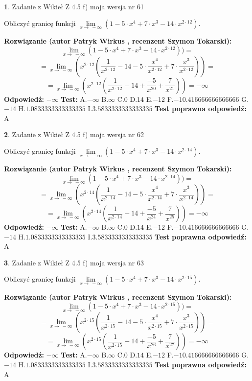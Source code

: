 \documentclass[12pt, a4paper]{article}
\theoremstyle{definition} %
\newtheorem{zad}{}
\newcommand{\zadStart}[1]{\begin{zad}#1\newline}
\newcommand{\zadStop}{\end{zad}}
\newcommand{\rozwStart}[2]{\noindent \textbf{Rozwiązanie (autor #1 , recenzent #2): }\newline}
\newcommand{\rozwStop}{\newline}
\newcommand{\odpStart}{\noindent \textbf{Odpowiedź:}\newline}
\newcommand{\odpStop}{\newline}
\newcommand{\testStart}{\noindent \textbf{Test:}\newline}
\newcommand{\testStop}{\newline}
\newcommand{\kluczStart}{\noindent \textbf{Test poprawna odpowiedź:}\newline}
\newcommand{\kluczStop}{\newline}
\begin{document}
\zadStart{Zadanie z Wikieł Z 4.5 f) moja wersja nr 61}


Obliczyć granicę funkcji  $\lim\limits_{x\to\ -\infty}(1 - 5 \cdot x^{4}+7 \cdot x^{3}- 14 \cdot x^{2\cdot12})$.
\zadStop
\rozwStart{Patryk Wirkus}{Szymon Tokarski}
$$\lim\limits_{x\to\ -\infty}(1 - 5 \cdot x^{4}+7 \cdot x^{3}- 14 \cdot x^{2\cdot12}))=$$
$$=\lim\limits_{x\to\ -\infty}(x^{2\cdot12}(\frac{1}{x^{2\cdot12}}-14 -5 \cdot \frac{x^{4}}{x^{2\cdot12}}+7 \cdot \frac{x^{3}}{x^{2\cdot12}}))=$$
$$=\lim\limits_{x\to\ -\infty}(x^{2\cdot12}(\frac{1}{x^{2\cdot12}}-14 + \frac{-5}{x^{20}}+ \frac{7}{x^{21}}))=-\infty$$
\rozwStop
\odpStart
$-\infty$
\odpStop
\testStart
A.$-\infty$ B.$\infty$ C.$0$ D.$14$ E.$-12$
F.$-10.416666666666666$ G.$-14$
H.$1.0833333333333335$
I.$3.5833333333333335$
\testStop
\kluczStart
A
\kluczStop



\zadStart{Zadanie z Wikieł Z 4.5 f) moja wersja nr 62}


Obliczyć granicę funkcji  $\lim\limits_{x\to\ -\infty}(1 - 5 \cdot x^{4}+7 \cdot x^{3}- 14 \cdot x^{2\cdot14})$.
\zadStop
\rozwStart{Patryk Wirkus}{Szymon Tokarski}
$$\lim\limits_{x\to\ -\infty}(1 - 5 \cdot x^{4}+7 \cdot x^{3}- 14 \cdot x^{2\cdot14}))=$$
$$=\lim\limits_{x\to\ -\infty}(x^{2\cdot14}(\frac{1}{x^{2\cdot14}}-14 -5 \cdot \frac{x^{4}}{x^{2\cdot14}}+7 \cdot \frac{x^{3}}{x^{2\cdot14}}))=$$
$$=\lim\limits_{x\to\ -\infty}(x^{2\cdot14}(\frac{1}{x^{2\cdot14}}-14 + \frac{-5}{x^{24}}+ \frac{7}{x^{25}}))=-\infty$$
\rozwStop
\odpStart
$-\infty$
\odpStop
\testStart
A.$-\infty$ B.$\infty$ C.$0$ D.$14$ E.$-12$
F.$-10.416666666666666$ G.$-14$
H.$1.0833333333333335$
I.$3.5833333333333335$
\testStop
\kluczStart
A
\kluczStop



\zadStart{Zadanie z Wikieł Z 4.5 f) moja wersja nr 63}


Obliczyć granicę funkcji  $\lim\limits_{x\to\ -\infty}(1 - 5 \cdot x^{4}+7 \cdot x^{3}- 14 \cdot x^{2\cdot15})$.
\zadStop
\rozwStart{Patryk Wirkus}{Szymon Tokarski}
$$\lim\limits_{x\to\ -\infty}(1 - 5 \cdot x^{4}+7 \cdot x^{3}- 14 \cdot x^{2\cdot15}))=$$
$$=\lim\limits_{x\to\ -\infty}(x^{2\cdot15}(\frac{1}{x^{2\cdot15}}-14 -5 \cdot \frac{x^{4}}{x^{2\cdot15}}+7 \cdot \frac{x^{3}}{x^{2\cdot15}}))=$$
$$=\lim\limits_{x\to\ -\infty}(x^{2\cdot15}(\frac{1}{x^{2\cdot15}}-14 + \frac{-5}{x^{26}}+ \frac{7}{x^{27}}))=-\infty$$
\rozwStop
\odpStart
$-\infty$
\odpStop
\testStart
A.$-\infty$ B.$\infty$ C.$0$ D.$14$ E.$-12$
F.$-10.416666666666666$ G.$-14$
H.$1.0833333333333335$
I.$3.5833333333333335$
\testStop
\kluczStart
A
\kluczStop
\end{document}
